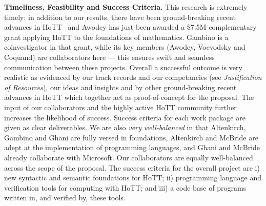 \documentclass[a4paper,11pt]{article}
\begin{document}






{\bf Timeliness, Feasibility and Success Criteria.}  This research is
extremely timely: in addition to our results, there have been
ground-breaking recent advances in
HoTT~\cite{ShulmanM:uniidh,BezemM:cubsmt, nominal} and Awodey has just
been awarded a \$7.5M complementary grant applying HoTT to the
foundations of mathematics. Gambino is a coinvestigator in that grant,
while its key members (Awodey, Voevodsky and Coquand) are
collaborators here --- this ensures swift and seamless communication
between these projects.  Overall a successful outcome is very realistic
as evidenced by our track records and our competancies (see {\em
  Justification of Resources}), our ideas and insights and by other
ground-breaking recent advances in HoTT which together act as
proof-of-concept for the proposal. The input of our collaborators and
the highly active HoTT community further increases the likelihood of
success. Success criteria for each work package are given as clear
deliverables. We are also {\em very well-balanced} in that Altenkirch,
Gambino and Ghani are fully versed in foundations, Altenkirch and
McBride are adept at the implementation of programming languages, and
Ghani and McBride already collaborate with Microsoft.  Our
collaborators are equally well-balanced across the scope of the
proposal.  The success criteria for the overall project are i) new
syntactic and semantic foundations for HoTT; ii) programming language
and verification tools for computing with HoTT; and iii) a code base
of programs written in, and verified by, these tools.

\end{document}
